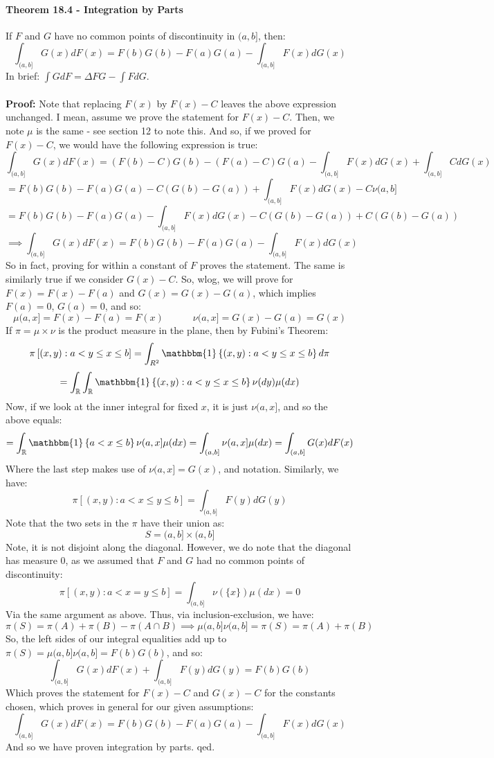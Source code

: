 \documentclass[12pt,a4paper]{article}
\newcommand{\1}[1]{\mathbbm{1}\left\{ #1 \right\}}
\newcommand{\R}{\mathbb{R}}
\begin{document}
\paragraph{Theorem 18.4 - Integration by Parts} If $F$ and $G$ have no common points of discontinuity in $(a,b]$, then:
$$
	\int_{(a,b]} G(x) dF(x) =
	F(b)G(b) - F(a)G(a) - \int_{(a,b]} F(x) dG(x)
$$
In brief: $\int G dF = \Delta FG - \int F dG$.
\\\\
\textbf{Proof:} Note that replacing $F(x)$ by $F(x) - C$ leaves the above expression unchanged. I mean, assume we prove the statement for $F(x) - C$. Then, we note $\mu$ is the same - see section 12 to note this. And so, if we proved for $F(x) - C$, we would have the following expression is true:
$$
	\int_{(a,b]} G(x) dF(x) = (F(b) - C)G(b) - (F(a) - C)G(a) - \int_{(a,b]} F(x) dG(x) + \int_{(a,b]} C dG(x)
$$
$$
	= F(b)G(b) - F(a)G(a) - C(G(b) - G(a)) + \int_{(a,b]} F(x) dG(x) - C\nu(a,b]
$$
$$
	= F(b)G(b) - F(a)G(a) - \int_{(a,b]} F(x) dG(x) - C(G(b) - G(a)) + C(G(b) - G(a))
$$
$$
	\implies
	\int_{(a,b]} G(x) dF(x) =
	F(b)G(b) - F(a)G(a) - \int_{(a,b]} F(x) dG(x)
$$
So in fact, proving for within a constant of $F$ proves the statement. The same is similarly true if we consider $G(x) - C$. So, wlog, we will prove for $F(x) = F(x) - F(a)$ and $G(x) = G(x) - G(a)$, which implies $F(a) = 0$, $G(a) = 0$, and so:
$$
	\mu(a,x] = F(x) - F(a) = F(x)
	\quad\quad\quad
	\nu(a,x] = G(x) - G(a) = G(x)
$$
If $\pi = \mu \times \nu$ is the product measure in the plane, then by Fubini's Theorem:
$$
	\pi\left[(x,y) : a < y \leq x \leq b\right] =
	\int_{R^2} \1{(x,y) : a < y \leq x \leq b} d\pi
$$
$$
	= \int_\R\int_\R \1{(x,y) : a < y \leq x \leq b} \nu(dy)\mu(dx)
$$
Now, if we look at the inner integral for fixed $x$, it is just $\nu(a,x]$, and so the above equals:
$$
	= \int_\R \1{a < x \leq b}\nu(a,x] \mu(dx) =
	\int_{(a,b]} \nu(a,x] \mu(dx) =
	\int_{(a,b]} G(x) dF(x)
$$
Where the last step makes use of $\nu(a,x] = G(x)$, and notation. Similarly, we have:
$$
	\pi\left[(x,y) : a < x \leq y \leq b\right] =
	\int_{(a,b]} F(y) dG(y)
$$
Note that the two sets in the $\pi$ have their union as:
$$
	S = (a,b] \times (a,b]
$$
Note, it is not disjoint along the diagonal. However, we do note that the diagonal has measure $0$, as we assumed that $F$ and $G$ had no common points of discontinuity:
$$
	\pi\left[(x,y) : a < x = y \leq b\right] =
	\int_{(a,b]} \nu(\{x\}) \mu(dx) = 0
$$
Via the same argument as above. Thus, via inclusion-exclusion, we have:
$$
	\pi(S) = \pi(A) + \pi(B) - \pi(A \cap B) \implies
	\mu(a,b]\nu(a,b] = \pi(S) = \pi(A) + \pi(B)
$$
So, the left sides of our integral equalities add up to $\pi(S) = \mu(a,b]\nu(a,b] = F(b)G(b)$, and so:
$$
	\int_{(a,b]} G(x) dF(x) + \int_{(a,b]} F(y) dG(y) = F(b)G(b)
$$
Which proves the statement for $F(x) - C$ and $G(x) - C$ for the constants chosen, which proves in general for our given assumptions:
$$
	\int_{(a,b]} G(x) dF(x) =
	F(b)G(b) - F(a)G(a) - \int_{(a,b]} F(x) dG(x)
$$
And so we have proven integration by parts. qed.
\end{document}
